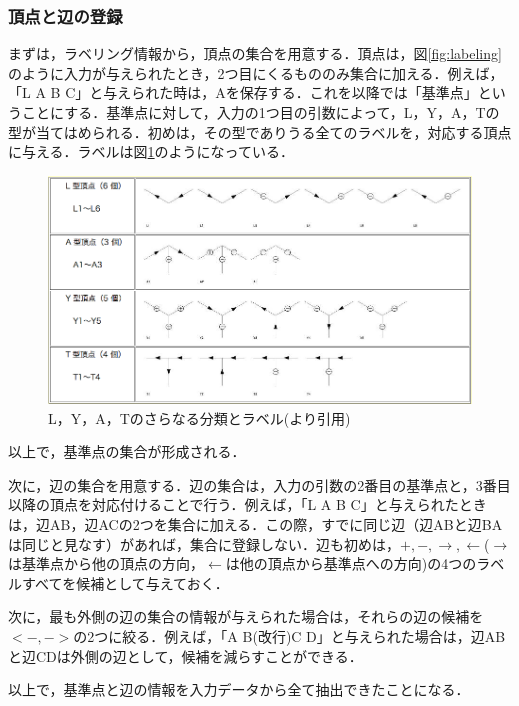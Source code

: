 \documentclass{jarticle}
\begin{document}
\subsubsection{頂点と辺の登録}
まずは，ラベリング情報から，頂点の集合を用意する．頂点は，図\ref{fig:labeling}のように入力が与えられたとき，2つ目にくるもののみ集合に加える．例えば，「L A B C」と与えられた時は，Aを保存する．これを以降では「基準点」ということにする．基準点に対して，入力の1つ目の引数によって，L，Y，A，Tの型が当てはめられる．初めは，その型でありうる全てのラベルを，対応する頂点に与える．ラベルは図\ref{fig:reference}のようになっている．

\begin{figure}[H]
\begin{center}
\includegraphics[width=180mm]{image/reference.png}
\caption{L，Y，A，Tのさらなる分類とラベル(\cite{ref:labeling}より引用)}
\label{fig:reference}
\end{center}
\end{figure}

以上で，基準点の集合が形成される．

次に，辺の集合を用意する．辺の集合は，入力の引数の2番目の基準点と，3番目以降の頂点を対応付けることで行う．例えば，「L A B C」と与えられたときは，辺AB，辺ACの2つを集合に加える．この際，すでに同じ辺（辺ABと辺BAは同じと見なす）があれば，集合に登録しない．辺も初めは，$+, -, \rightarrow, \leftarrow$($\rightarrow$は基準点から他の頂点の方向，$\leftarrow$は他の頂点から基準点への方向)の4つのラベルすべてを候補として与えておく．

次に，最も外側の辺の集合の情報が与えられた場合は，それらの辺の候補を$<-,->$の2つに絞る．例えば，「A B(改行)C D」と与えられた場合は，辺ABと辺CDは外側の辺として，候補を減らすことができる．

以上で，基準点と辺の情報を入力データから全て抽出できたことになる．
\end{document}
